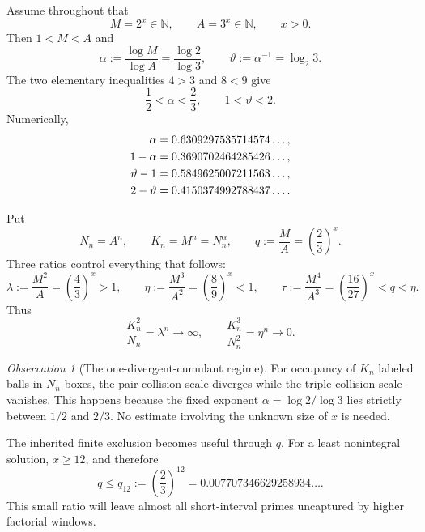 \documentclass[11pt,oneside]{article}
\theoremstyle{definition}
\theoremstyle{remark}
\newtheorem{observation}[theorem]{Observation}
\newcommand{\N}{\mathbb N}
\newcommand{\thetaAE}{\vartheta}
\begin{document}
Assume throughout that
\begin{equation}
 M=2^x\in\N,\qquad A=3^x\in\N,
 \qquad x>0.
 \label{eq:MA}
\end{equation}
Then $1<M<A$ and
\begin{equation}
 \alpha:=\frac{\log M}{\log A}=\frac{\log2}{\log3},
 \qquad
 \thetaAE:=\alpha^{-1}=\log_2 3.
 \label{eq:alpha-theta}
\end{equation}
The two elementary inequalities $4>3$ and $8<9$ give
\begin{equation}
 \frac12<\alpha<\frac23,
 \qquad
 1<\thetaAE<2.
 \label{eq:alpha-window}
\end{equation}
Numerically,
\begin{align}
 \alpha&=0.6309297535714574\ldots,\notag\\
 1-\alpha&=0.3690702464285426\ldots,\notag\\
 \thetaAE-1&=0.5849625007211563\ldots,\notag\\
 2-\thetaAE&=0.4150374992788437\ldots.
 \label{eq:universal-constants}
\end{align}

Put
\begin{equation}
 N_n=A^n,
 \qquad K_n=M^n=N_n^{\alpha},
 \qquad q:=\frac MA=\left(\frac23\right)^x.
 \label{eq:NKq}
\end{equation}
Three ratios control everything that follows:
\begin{equation}
 \lambda:=\frac{M^2}{A}=\left(\frac43\right)^x>1,
 \qquad
 \eta:=\frac{M^3}{A^2}=\left(\frac89\right)^x<1,
 \qquad
 \tau:=\frac{M^4}{A^3}=\left(\frac{16}{27}\right)^x<q<\eta.
 \label{eq:lambda-eta-tau}
\end{equation}
Thus
\begin{equation}
 \frac{K_n^2}{N_n}=\lambda^n\longrightarrow\infty,
 \qquad
 \frac{K_n^3}{N_n^2}=\eta^n\longrightarrow0.
 \label{eq:mesoscopic-two-three}
\end{equation}

\begin{observation}[The one-divergent-cumulant regime]
\label{obs:one-divergent}
For occupancy of $K_n$ labeled balls in $N_n$ boxes, the pair-collision scale diverges while
the triple-collision scale vanishes.  This happens because the fixed exponent
$\alpha=\log2/\log3$ lies strictly between $1/2$ and $2/3$.  No estimate involving the
unknown size of $x$ is needed.
\end{observation}

The inherited finite exclusion becomes useful through $q$.  For a least nonintegral
solution, $x\ge12$, and therefore
\begin{equation}
 q\le q_{12}:=\left(\frac23\right)^{12}
 =0.007707346629258934\ldots.
 \label{eq:q12}
\end{equation}
This small ratio will leave almost all short-interval primes uncaptured by higher factorial
windows.
\end{document}
